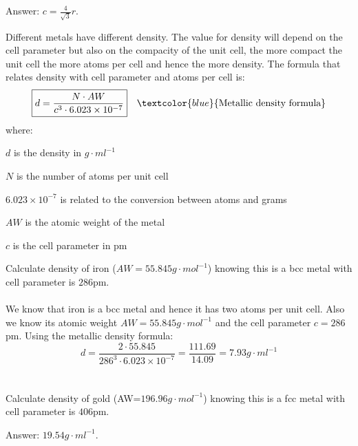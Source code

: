 \documentclass[main.tex]{subfiles}
\begin{document}
\begin{description}
\begin{example}
\begin{center}
{
}
\end{center}

\begin{flushright} Answer: $c=\frac{4}{\sqrt{3}}r$.\end{flushright}
\end{example}%


\item[\docfilehook{Metal density}{}] Different metals have different density. The value for density will depend on the cell parameter but also on the compacity of the unit cell, the more compact the unit cell the more atoms per cell and hence the more density. The formula that relates density with cell parameter and atoms per cell is:
\begin{equation*}
\boxed{  d=\frac{N\cdot AW}{c^3\cdot 6.023\times 10^{-7}}  } \quad \textcolor{blue}{\text{Metallic density formula}}
\end{equation*}
where:
\begin{where}
 \item $d$   is the density in $g\cdot ml^{-1}$
 \item $N$   is the number of atoms per unit cell 
  \item $6.023\times 10^{-7}$ is related to the conversion between atoms and grams
 \item $AW$  is the atomic weight of the metal
  \item $c$  is the cell parameter in pm
\end{where}

\begin{example} %
Calculate density of iron ($AW=55.845g\cdot mol^{-1}$) knowing this is a bcc metal with cell parameter is $286$pm. 
\\
\\
We know that iron is a bcc metal and hence it has two atoms per unit cell. Also we know its atomic weight $AW=55.845g\cdot mol^{-1}$ and the cell parameter $c=286$pm. Using the metallic density formula: 
\begin{equation*}
 d=\frac{2\cdot 55.845}{286^3\cdot 6.023\times 10^{-7}}=\frac{111.69 }{14.09}=7.93g\cdot ml^{-1}   
\end{equation*}
\\
\faDiamond\ \\
Calculate density of gold (AW=$196.96g\cdot mol^{-1}$) knowing this is a fcc metal with cell parameter is $406$pm. 
\begin{flushright} Answer: $19.54g\cdot ml^{-1}$.\end{flushright}
\end{example}%





\end{description}
\end{document}

